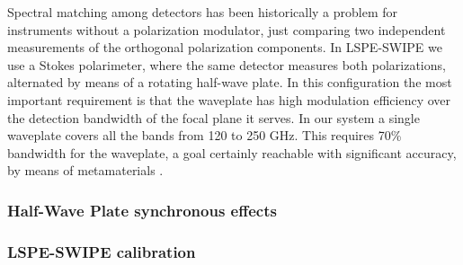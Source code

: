 Spectral matching among detectors 
has been historically a problem for instruments without a polarization modulator, just comparing
two independent measurements of the orthogonal polarization components. 
In LSPE-SWIPE we use a Stokes polarimeter, where the same detector measures both polarizations,
alternated by means of a rotating half-wave plate. In this configuration the most important requirement is
that the waveplate has high modulation efficiency over the detection bandwidth of the focal plane it
serves. In our system a single waveplate covers all the bands from 120 to 250 GHz. This
requires 70\% bandwidth for the waveplate, a goal certainly reachable with significant
accuracy, by means of metamaterials \citep[see][]{Pisano:06}.

\subsubsection{Half-Wave Plate synchronous effects}

\citep[see][]{ritacco2017}

\subsubsection{LSPE-SWIPE calibration }


